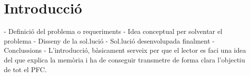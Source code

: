 \section{Introducció}

        - Definició del problema o requeriments
        - Idea conceptual per solventar el problema
        - Disseny de la sol.lució
        - Sol.lució desenvolupada finalment
        - Conclussions
- L'introducció, bàsicament serveix per que el
        lector es faci una idea del que explica la memòria
        i ha de conseguir transmetre de forma clara
        l'objectiu de tot el PFC.
